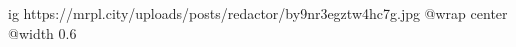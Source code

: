  
 
 
 
 

\ifcmt
  ig https://mrpl.city/uploads/posts/redactor/by9nr3egztw4hc7g.jpg
  @wrap center
  @width 0.6
\fi
